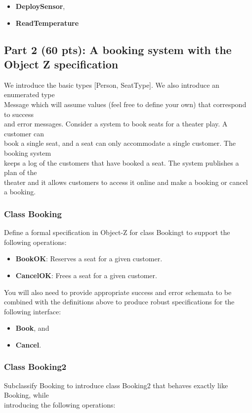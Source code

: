 \documentclass[12pt]{article}
\begin{document}
\begin{itemize}
	\item \textbf{DeploySensor},
	\item \textbf{ReadTemperature}
\end{itemize}

\newpage

\subsection{Part 2 (60 pts): A booking system with the Object Z specification}

\noindent We introduce the basic types [Person, SeatType]. We also introduce an enumerated type\\
Message which will assume values (feel free to define your own) that correspond to success\\
and error messages. Consider a system to book seats for a theater play. A customer can\\
book a single seat, and a seat can only accommodate a single customer. The booking system\\
keeps a log of the customers that have booked a seat. The system publishes a plan of the\\
theater and it allows customers to access it online and make a booking or cancel a booking.

\subsubsection{Class Booking}
\noindent Define a formal specification in Object-Z for class Bookingt to support the following operations:
\begin{itemize}
	\item \textbf{BookOK}: Reserves a seat for a given customer.
	\item \textbf{CancelOK}: Frees a seat for a given customer.
\end{itemize}

\noindent You will also need to provide appropriate success and error schemata to be combined with
the definitions above to produce robust specifications for the following interface:
\begin{itemize}
	\item\textbf{Book}, and
	\item \textbf{Cancel}.
\end{itemize}

\subsubsection{Class Booking2}
\noindent Subclassify Booking to introduce class Booking2 that behaves exactly like Booking, while\\
introducing the following operations:
\end{document}
